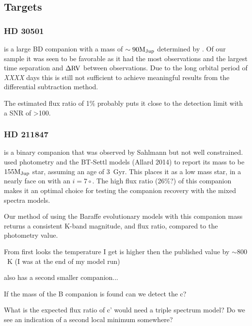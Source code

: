 
\subsection{Targets}
\label{subsec:targets}
\subsubsection{HD 30501}
\label{subsubsec:HD30501}
 is a large BD companion with a mass of \(\sim \rm 90 M_{Jup} \) determined by \citet{sahlmann_search_2011}. Of our sample it was seen to be favorable as it had the most observations and the largest time separation and \(\rm \Delta RV \) between observations. Due to the long orbital period of \emph{XXXX} days this is still not sufficient to achieve meaningful results from the differential subtraction method.

The estimated flux ratio of 1\% probably puts it close to the detection limit with a SNR of >100.


\subsubsection{HD 211847}
\label{subsubsec:HD211847}
 is a binary companion that was observed by Sahlmann but not well constrained. \citet{moutou_eccentricity_2017} used photometry and the BT-Settl models (Allard 2014) to report its mass to be \(\rm 155 M_{Jup} \) star, assuming an age of 3~Gyr. This places it as a low mass star, in a nearly face on with an \(i=7\circ \).
The high flux ratio (26\%?) of this companion makes it an optimal choice for testing the companion recovery with the mixed spectra models.

Our method of using the Baraffe evolutionary models with this companion mass returns a consistent K-band magnitude, and flux ratio, compared to the photometry value.

From first looks the temperature I get is higher then the published value by \(\sim800\)~K  (I was at the end of my model run)

 also has a second smaller companion...

If the mass of the B companion is found can we detect the c?

What is the expected flux ratio of c' would need a triple spectrum model? Do we see an indication of a second local minimum somewhere?
%

